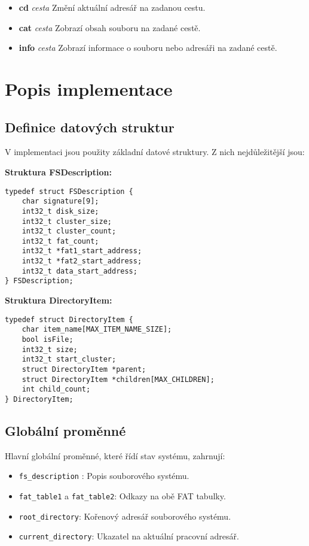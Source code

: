 \documentclass[12pt]{article}
\begin{document}
\begin{itemize}
    \item \textbf{cd} \textit{cesta} \newline
    Změní aktuální adresář na zadanou cestu.

    \item \textbf{cat} \textit{cesta} \newline
    Zobrazí obsah souboru na zadané cestě.

    \item \textbf{info} \textit{cesta} \newline
    Zobrazí informace o souboru nebo adresáři na zadané cestě.
\end{itemize}
\newpage
\section*{Popis implementace}

\subsection*{Definice datových struktur}
V implementaci jsou použity základní datové struktury. Z nich nejdůležitější jsou:

\textbf{Struktura FSDescription:}
\begin{lstlisting}[caption={Struktura popisující souborový systém}, label={lst:fsdescription}]
typedef struct FSDescription {
    char signature[9];
    int32_t disk_size;
    int32_t cluster_size;
    int32_t cluster_count;
    int32_t fat_count;
    int32_t *fat1_start_address;
    int32_t *fat2_start_address;
    int32_t data_start_address;
} FSDescription;
\end{lstlisting}

\textbf{Struktura DirectoryItem:}
\begin{lstlisting}[caption={Struktura adresáře a souboru}, label={lst:directoryitem}]
typedef struct DirectoryItem {
    char item_name[MAX_ITEM_NAME_SIZE];
    bool isFile;
    int32_t size;
    int32_t start_cluster;
    struct DirectoryItem *parent;
    struct DirectoryItem *children[MAX_CHILDREN];
    int child_count;
} DirectoryItem;
\end{lstlisting}

\subsection*{Globální proměnné}
Hlavní globální proměnné, které řídí stav systému, zahrnují:

\begin{itemize}
    \item \texttt{fs\_description} : Popis souborového systému.
    \item \texttt{fat\_table1} a \texttt{fat\_table2}: Odkazy na obě FAT tabulky.
    \item \texttt{root\_directory}: Kořenový adresář souborového systému.
    \item \texttt{current\_directory}: Ukazatel na aktuální pracovní adresář.
\end{itemize}
\end{document}
